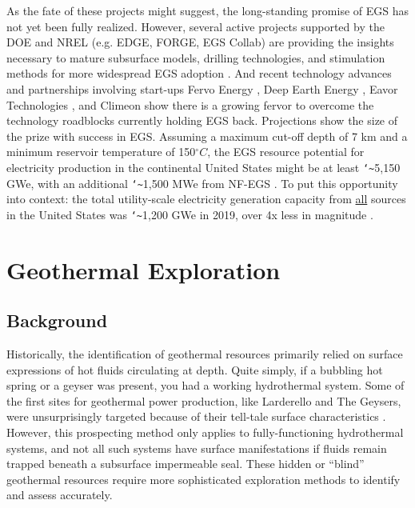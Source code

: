 As the fate of these projects might suggest, the long-standing promise of EGS has not yet been fully realized. However, several active projects supported by the DOE and NREL (e.g. EDGE, FORGE, EGS Collab) are providing the insights necessary to mature subsurface models, drilling technologies, and stimulation methods for more widespread EGS adoption \citep{hamm_geothermal_2021}. And recent technology advances and partnerships involving start-ups Fervo Energy \citep{moss_google_2021,shieber_geothermal_2021}, Deep Earth Energy \citep{geoenergy_saskatchewan_2021}, Eavor Technologies \citep{ross_energy_2020}, and Climeon \citep{climeon_climeon_2021,geoenergy_baseload_2020} show there is a growing fervor to overcome the technology roadblocks currently holding EGS back. Projections show the size of the prize with success in EGS. Assuming a maximum cut-off depth of 7 km and a minimum reservoir temperature of 150\(^\circ C\), the EGS resource potential for electricity production in the continental United States might be at least \texttt{\char`\~}5,150 GWe, with an additional \texttt{\char`\~}1,500 MWe from NF-EGS \citep{augustine_geovision_2019}. To put this opportunity into context: the total utility-scale electricity generation capacity from \underline{all} sources in the United States was \texttt{\char`\~}1,200 GWe in 2019, over 4x less in magnitude \citep{eia_electric_2020}.

\section{Geothermal Exploration}\label{ch2:geoexp}
\subsection{Background}
Historically, the identification of geothermal resources primarily relied on surface expressions of hot fluids circulating at depth. Quite simply, if a bubbling hot spring or a geyser was present, you had a working hydrothermal system. Some of the first sites for geothermal power production, like Larderello and The Geysers, were unsurprisingly targeted because of their tell-tale surface characteristics \citep[~p. 111]{glassley_geothermal_2015}. However, this prospecting method only applies to fully-functioning hydrothermal systems, and not all such systems have surface manifestations if fluids remain trapped beneath a subsurface impermeable seal. These hidden or “blind” geothermal resources require more sophisticated exploration methods to identify and assess accurately.
